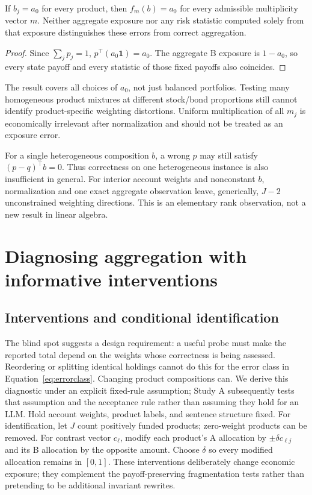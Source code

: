 \begin{proposition}\label{prop:blind}
If $b_j=a_0$ for every product, then $f_m(b)=a_0$ for every admissible multiplicity vector $m$. Neither aggregate exposure nor any risk statistic computed solely from that exposure distinguishes these errors from correct aggregation.
\end{proposition}
\begin{proof}
Since $\sum_jp_j=1$, $p^\top(a_0\mathbf1)=a_0$. The aggregate B exposure is $1-a_0$, so every state payoff and every statistic of those fixed payoffs also coincides.
\end{proof}
The result covers all choices of $a_0$, not just balanced portfolios. Testing many homogeneous product mixtures at different stock/bond proportions still cannot identify product-specific weighting distortions. Uniform multiplication of all $m_j$ is economically irrelevant after normalization and should not be treated as an exposure error.

For a single heterogeneous composition $b$, a wrong $p$ may still satisfy $(p-q)^\top b=0$. Thus correctness on one heterogeneous instance is also insufficient in general. For interior account weights and nonconstant $b$, normalization and one exact aggregate observation leave, generically, $J-2$ unconstrained weighting directions. This is an elementary rank observation, not a new result in linear algebra.

\section{Diagnosing aggregation with informative interventions}\label{sec:diagnostics}
\subsection{Interventions and conditional identification}
The blind spot suggests a design requirement: a useful probe must make the reported total depend on the weights whose correctness is being assessed. Reordering or splitting identical holdings cannot do this for the error class in Equation~\ref{eq:errorclass}. Changing product compositions can. We derive this diagnostic under an explicit fixed-rule assumption; Study A subsequently tests that assumption and the acceptance rule rather than assuming they hold for an LLM.
Hold account weights, product labels, and sentence structure fixed. For identification, let $J$ count positively funded products; zero-weight products can be removed. For contrast vector $c_\ell$, modify each product's A allocation by $\pm\delta c_{\ell j}$ and its B allocation by the opposite amount. Choose $\delta$ so every modified allocation remains in $[0,1]$. These interventions deliberately change economic exposure; they complement the payoff-preserving fragmentation tests rather than pretending to be additional invariant rewrites.

